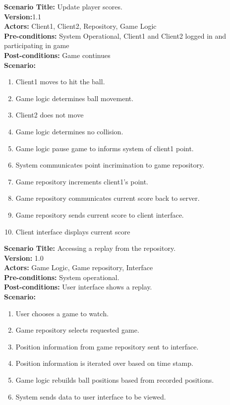 \documentclass[letterpaper,12pt]{article}
\begin{document}
\noindent \textbf{Scenario Title:} Update player scores.\\
\textbf{Version:}1.1\\
\textbf{Actors:} Client1, Client2, Repository, Game Logic\\
\textbf{Pre-conditions:} System Operational, Client1 and Client2 logged in and participating in game \\
\textbf{Post-conditions:} Game continues\\
\textbf{Scenario:}\\
\begin{enumerate}
\item Client1 moves to hit the ball.
\item Game logic determines ball movement.
\item Client2 does not move 
\item Game logic determines no collision. 
\item Game logic pause game to informs system of client1 point.
\item System communicates point incrimination to game repository.
\item Game repository increments client1’s point.
\item Game repository communicates current score back to server.
\item Game repository sends current score to client interface.
\item Client interface displays current score
\end{enumerate}

\noindent \textbf{Scenario Title:} Accessing a replay from the repository.\\
\textbf{Version:} 1.0\\
\textbf{Actors:} Game Logic, Game repository, Interface\\
\textbf{Pre-conditions:} System operational.\\
\textbf{Post-conditions:} User interface shows a replay.\\
\textbf{Scenario:}\\
\begin{enumerate}
\item User chooses a game to watch.
\item Game repository selects requested game.
\item Position information from game repository sent to interface.
\item Position information is iterated over based on time stamp.
\item Game logic rebuilds ball positions based from recorded positions.
\item System sends data to user interface to be viewed.
\end{enumerate}
\end{document}
